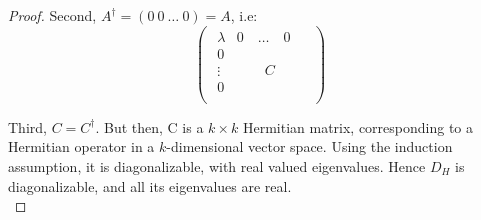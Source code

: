\documentclass[solutions.tex]{subfiles}
\begin{document}
\begin{proof}
Second, $A^\dagger = (0\ 0\ \ldots\ 0) = A$, i.e:
\[
	\begin{pmatrix}\begin{array}{c|c}
		\lambda & 0\quad\ldots\quad 0     \\
		\hline
		0       & \qquad ~ \qquad \\
		\vdots  & \qquad C \qquad \\
		0       & \qquad ~ \qquad \\
	\end{array}\end{pmatrix}
\]

Third, $C = C^\dagger$. But then, C is a $k\times k$ Hermitian
matrix, corresponding to a Hermitian operator in a $k$-dimensional
vector space. Using the induction assumption, it is diagonalizable,
with real valued eigenvalues. Hence $D_H$ is diagonalizable, and
all its eigenvalues are real. \\

\end{proof}
\end{document}
